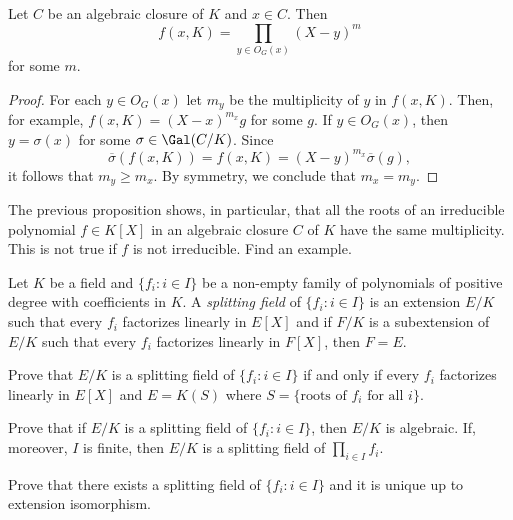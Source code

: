 \begin{proposition}
    Let $C$ be an algebraic closure of $K$ and $x\in C$. Then 
    \[
    f(x,K)=\prod_{y\in O_G(x)}(X-y)^m
    \]
    for some $m$. 
\end{proposition}

\begin{proof}
    For each $y\in O_G(x)$ let $m_y$ be the multiplicity
    of $y$ in $f(x,K)$. 
    Then, for example,
    $f(x,K)=(X-x)^{m_x}g$ for some $g$. If $y\in O_G(x)$, 
    then $y=\sigma(x)$ for some $\sigma\in\Gal(C/K)$. Since
    \[
    \overline{\sigma}(f(x,K))=f(x,K)=(X-y)^{m_x}\overline{\sigma}(g), 
    \]
    it follows that $m_y\geq m_x$. By symmetry, 
    we conclude that $m_x=m_y$. 
\end{proof}

The previous proposition shows, in particular, 
that all the roots of 
an irreducible polynomial $f\in K[X]$ 
in an algebraic closure $C$ of $K$
have the same multiplicity. This is  
not true if $f$ is not irreducible. Find an example.



\begin{definition}
    Let $K$ be a field and $\{f_i:i\in I\}$ be a non-empty 
    family of polynomials of positive degree
    with coefficients in $K$. A \emph{splitting field} 
    of $\{f_i:i\in I\}$ is an extension $E/K$
    such that every $f_i$ factorizes linearly in $E[X]$ and 
    if $F/K$ is a subextension of $E/K$ such that every $f_i$ 
    factorizes linearly in $F[X]$, then $F=E$. 
\end{definition}

\begin{exercise}
    Prove that $E/K$ is a splitting field of
    $\{f_i:i\in I\}$ if and only if every $f_i$ factorizes linearly 
    in $E[X]$ and $E=K(S)$ where $S=\{\text{roots of $f_i$ for all $i$}\}$. 
\end{exercise}

\begin{exercise}
    Prove that if $E/K$ is a splitting field
    of $\{f_i:i\in I\}$, then $E/K$ is algebraic. If, moreover, 
    $I$ is finite, then $E/K$ is a splitting field
    of $\prod_{i\in I}f_i$. 
\end{exercise}

\begin{exercise}
    Prove that 
    there exists a splitting field of $\{f_i:i\in I\}$ 
    and it is unique up to extension isomorphism. 
\end{exercise}


